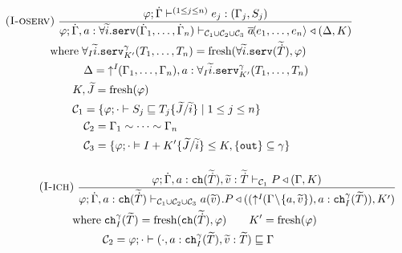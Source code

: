 \begin{table*}[!ht]
\begin{framed}
\begin{align*}
        &\kern-3em\runa{I-oserv}\;\infrule{\varphi;\dot{\Gamma}\vdash^{(1 \leq j \leq n)} e_j :  (\Gamma_j,S_j)}{\varphi;\dot{\Gamma},a : \forall\widetilde{i}.\texttt{serv}(\dot{\Gamma}_1,\dots,\dot{\Gamma}_n)\vdash_{ \mathcal{C}_1 \cup \mathcal{C}_2 \cup \mathcal{C}_3 } \asyncoutputch{a}{e_1,\dots,e_n}{} \triangleleft (\Delta,K)}\\[-1em]
        &\kern1em\text{where}\;  \forall_I\widetilde{i}.\texttt{serv}^{\gamma}_{K'}(T_1,\dots,T_n) = \text{fresh}(\forall\widetilde{i}.\texttt{serv}(\widetilde{\dot{T}}),\varphi)\\%
        &\kern4em \Delta =\; \uparrow^I\!\!(\Gamma_1,\dots,\Gamma_n),a:\forall_I\widetilde{i}.\texttt{serv}^{\gamma}_{K'}(T_1,\dots,T_n)\\
        &\kern3em K,\widetilde{J} = \text{fresh}(\varphi)\\
        &\kern3em \mathcal{C}_1 = \{ \varphi;\cdot\vdash S_j \sqsubseteq T_j\{\widetilde{J}/\widetilde{i}\} \mid 1 \leq j \leq n\}\\
        &\kern4em \mathcal{C}_2 = \Gamma_1 \sim \cdots \sim \Gamma_n \\
        &\kern4em \mathcal{C}_3 = \{\varphi;\cdot\vDash I + K'\{\widetilde{J}/\widetilde{i}\} \leq K, \{\texttt{out}\} \subseteq \gamma\}\\
        &\runa{I-ich}\;\infrule{ \varphi;\dot{\Gamma},a:\texttt{ch}(\widetilde{\dot{T}}),\widetilde{v}:\widetilde{\dot{T}}\vdash_{\mathcal{C}_1} P \triangleleft (\Gamma,K) }{\varphi;\dot{\Gamma},a:\texttt{ch}(\widetilde{\dot{T}})\vdash_{ \mathcal{C}_1 \cup \mathcal{C}_2 \cup \mathcal{C}_3 } \inputch{a}{\widetilde{v}}{}{P} \triangleleft ((\uparrow^I\!\!(\Gamma\! \setminus\! \{a,\widetilde{v}\}),a:\texttt{ch}_I^\gamma(\widetilde{T})) , K') }\\[-1em]
        &\kern3em\text{where}\; \texttt{ch}^\gamma_I(\widetilde{T}) = \text{fresh}(\texttt{ch}(\widetilde{\dot{T}}),\varphi)\kern2em K' = \text{fresh}(\varphi)\\
        &\kern5.7em \mathcal{C}_2 = \varphi;\cdot\vdash (\cdot,a:\texttt{ch}^\gamma_I(\widetilde{T}),\widetilde{v} : \widetilde{T}) \sqsubseteq \Gamma\\

\end{align*}
\end{framed}
\end{table*}
